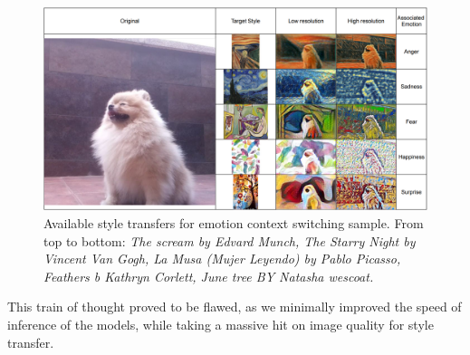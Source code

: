 \begin{figure}[ht]
    \centering
        \includegraphics[width=\textwidth]{resources/styletransfer_emogrid.png}        
        \caption{Available style transfers for emotion context switching sample. From top to bottom: 
            \emph{The scream by Edvard Munch, 
            The Starry Night by Vincent Van Gogh, 
            La Musa (Mujer Leyendo) by Pablo Picasso, 
            Feathers b Kathryn Corlett, 
            June tree BY Natasha wescoat.
            }
    } \label{fig:style_grid}
\end{figure}


This train of thought proved to be flawed, as we minimally improved the speed of inference of the models, while taking a massive hit on image quality for style transfer.
